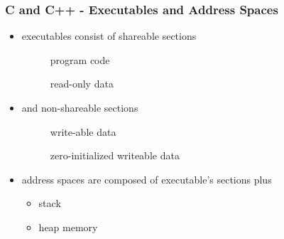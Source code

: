 \begin{frame}
 \frametitle{C and C++ - Executables and Address Spaces}
 \begin{itemize}
  \item executables consist of shareable sections
   \begin{description}
    \item[] program code
    \item[] read-only data
   \end{description}
  \item and non-shareable sections
   \begin{description}
    \item[] write-able data
    \item[] zero-initialized writeable data
   \end{description}
 \end{itemize}


 \begin{itemize}
  \item address spaces are composed of executable's sections plus
   \begin{itemize}
    \item stack
    \item heap memory
   \end{itemize}
 \end{itemize}
\end{frame}

